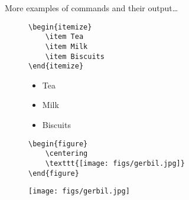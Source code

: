 \begin{frame}[fragile]{More examples of commands and their output\ldots}

    \begin{figure}[h]
        \centering
        \begin{minipage}{0.5\textwidth}
            \begin{lstlisting}[showlines=true]
\begin{itemize}
    \item Tea
    \item Milk
    \item Biscuits
\end{itemize}
            \end{lstlisting}
        \end{minipage}
        \begin{minipage}{0.4\textwidth}
            \begin{itemize}
                \item Tea
                \item Milk
                \item Biscuits
            \end{itemize}
        \end{minipage}
    \end{figure}


    \begin{figure}[h]
        \centering
        \begin{minipage}{0.5\textwidth}
            \begin{lstlisting}
\begin{figure}
    \centering
    \texttt{[image: figs/gerbil.jpg]}
\end{figure}
            \end{lstlisting}
        \end{minipage}
        \begin{minipage}{0.4\textwidth}
            \texttt{[image: figs/gerbil.jpg]}
        \end{minipage}
    \end{figure}


\end{frame}

